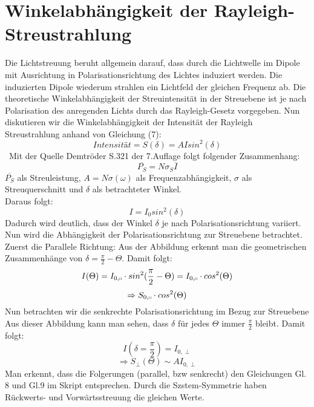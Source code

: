 \section{Winkelabhängigkeit der Rayleigh-Streustrahlung}
Die Lichtstreuung beruht allgemein darauf, dass durch die Lichtwelle im Dipole mit Ausrichtung in Polarisationsrichtung des Lichtes induziert werden. Die induzierten Dipole wiederum strahlen ein Lichtfeld der gleichen Frequenz ab. Die theoretische Winkelabhängigkeit der Streuintensität in der Streuebene ist je nach Polarisation des anregenden Lichts durch das Rayleigh-Gesetz vorgegeben. 
Nun diskutieren wir die Winkelabhängigkeit der Intensität der Rayleigh Streustrahlung anhand von Gleichung (7): 
\begin{equation}
Intensität = S(\delta)=AIsin^2(\delta)
\end{equation}\
Mit der Quelle Demtröder S.321 der 7.Auflage folgt folgender Zusammenhang:
\begin{equation}
\overline{P_S}=N\sigma_S \overline{I}
\end{equation}
$\overline{P_S}$ als Streuleistung, $A=N\sigma(\omega)$ als Frequenzabhängigkeit, $\sigma$ als Streuquerschnitt und $\delta$ als betrachteter Winkel.\\
Daraus folgt:
\begin{equation}
I=I_0 sin^2(\delta)
\end{equation}
Dadurch wird deutlich, dass der Winkel $\delta$ je nach Polarisationsrichtung variiert. \\
Nun wird die Abhängigkeit der Polarisationsrichtung zur Streuebene betrachtet. 
Zuerst die Parallele Richtung:
Aus der Abbildung erkennt man die geometrischen Zusammenhänge von $\delta=\frac{\pi}{2}-\Theta$. Damit folgt:
\begin{equation}
I(\Theta)=I_{0,\shortparallel}\cdot sin^2 (\frac{\pi}{2}-\Theta)=I_{0,\shortparallel}\cdot cos^2(\Theta)
\end{equation}
\begin{equation}
\Rightarrow S_{0,\shortparallel}\cdot cos^2(\Theta)
\end{equation}
Nun betrachten wir die senkrechte Polarisationsrichtung im Bezug zur Streuebene
Aus dieser Abbildung kann man sehen, dass $\delta$ für jedes $\Theta$ immer $\frac{\pi}{2}$ bleibt. Damit folgt:
\begin{equation}
I(\delta=\frac{\pi}{2}) = I_{0,\perp}
\end{equation}
\begin{equation}
\Rightarrow S_\perp (\Theta) \sim AI_{0,\perp}
\end{equation}
Man erkennt, dass die Folgerungen (parallel, bzw senkrecht) den Gleichungen Gl. 8 und Gl.9 im Skript entsprechen. 
Durch die Szstem-Symmetrie haben Rückwerts- und Vorwärtsstreuung die gleichen Werte.


